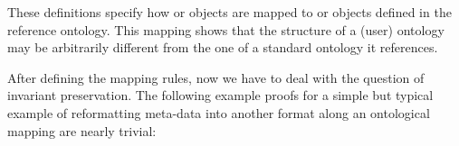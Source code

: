 \begin{isabellebody}
\begin{isamarkuptext}
These definitions specify how  or  objects are mapped to  
or  objects defined in the reference ontology.
This mapping shows that the structure of a (user) ontology may be arbitrarily different
from the one of a standard ontology it references.
\end{isamarkuptext}\isamarkuptrue%

\begin{isamarkuptext}
After defining the mapping rules, now we have to deal with the question of invariant preservation. 
The following example proofs for a simple but typical example of reformatting meta-data into another 
format along an ontological mapping are nearly trivial:


\begin{isarbox}


\end{isarbox}
\end{isamarkuptext}
\end{isabellebody}

